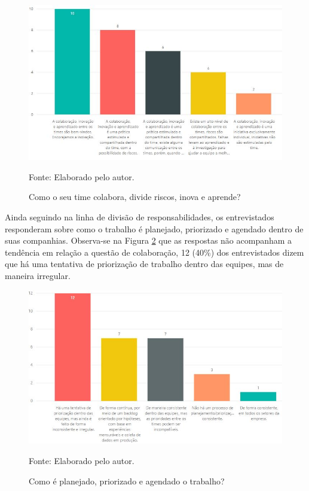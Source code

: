 \documentclass[twoside,english,brazilian]{UNISINOSartigo}
\newcommand{\source}[1]{\caption*{Fonte: {#1}} }
\begin{document}
\begin{figure}[H]
    \centering
        \caption{Como o seu time colabora, divide riscos, inova e aprende?}
       \includegraphics[scale=.6]{imagens/colaboracaoInovacao.JPG}
        \source{Elaborado pelo autor.}
    \label{fig:colaboracaoInovacao}
 \end{figure}
Ainda seguindo na linha de divisão de responsabilidades, os entrevistados responderam sobre como o trabalho é planejado, priorizado e agendado dentro de suas companhias. Observa-se na Figura \ref{fig:planejamentoTrabalho} que as respostas não acompanham a tendência em relação a questão de colaboração, 12 (40\%) dos entrevistados dizem que há uma tentativa de priorização de trabalho dentro das equipes, mas de maneira irregular. 

\begin{figure}[H]
    \centering
    \caption{Como é planejado, priorizado e agendado o trabalho?}
       \includegraphics[scale=.6]{imagens/priorizacao.JPG}
        \source{Elaborado pelo autor.}
    \label{fig:planejamentoTrabalho}
\end{figure}
\end{document}
